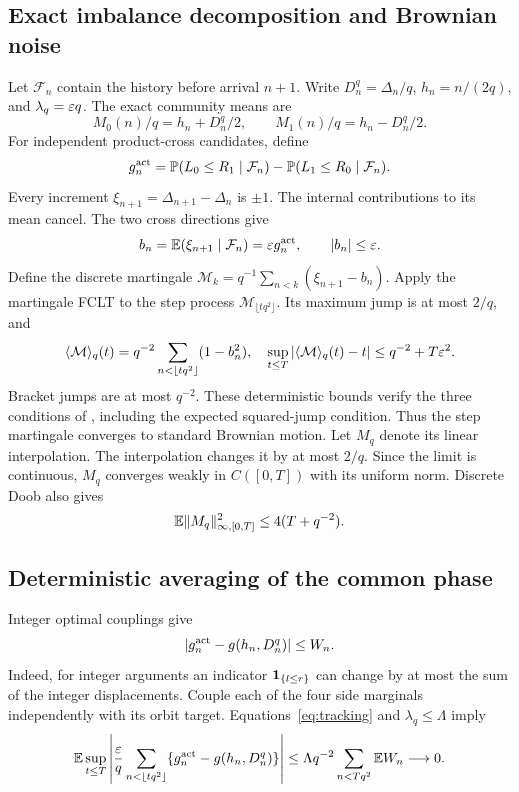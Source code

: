 \subsection{Exact imbalance decomposition and Brownian noise}
Let $\mathcal F_n$ contain the history before arrival $n+1$. Write $D_n^q=\Delta_n/q$, $h_n=n/(2q)$, and $\lambda_q=\varepsilon q$. The exact community means are
\[
 M_0(n)/q=h_n+D_n^q/2,\qquad M_1(n)/q=h_n-D_n^q/2.
\]
For independent product-cross candidates, define
\[
 g_n^{\rm act}=\mathbb P(L_0\le R_1\mid\mathcal F_n)
                -\mathbb P(L_1\le R_0\mid\mathcal F_n).
\]
Every increment $\xi_{n+1}=\Delta_{n+1}-\Delta_n$ is $\pm1$. The internal contributions to its mean cancel. The two cross directions give
\[
 b_n=\mathbb E(\xi_{n+1}\mid\mathcal F_n)=\varepsilon g_n^{\rm act},
 \qquad |b_n|\le\varepsilon.
\]
Define the discrete martingale $\mathcal M_k=q^{-1}\sum_{n<k}(\xi_{n+1}-b_n)$. Apply the martingale FCLT to the step process $\mathcal M_{\lfloor tq^2\rfloor}$. Its maximum jump is at most $2/q$, and
\[
 \langle\mathcal M\rangle_q(t)
 =q^{-2}\sum_{n<\lfloor tq^2\rfloor}(1-b_n^2),
 \quad
 \sup_{t\le T}|\langle\mathcal M\rangle_q(t)-t|
 \le q^{-2}+T\varepsilon^2.
\]
Bracket jumps are at most $q^{-2}$. These deterministic bounds verify the three conditions of \cite[Theorem~2.1(ii)]{whitt}, including the expected squared-jump condition. Thus the step martingale converges to standard Brownian motion. Let $M_q$ denote its linear interpolation. The interpolation changes it by at most $2/q$. Since the limit is continuous, $M_q$ converges weakly in $C([0,T])$ with its uniform norm. Discrete Doob also gives
\begin{equation}\label{eq:martmoment}
 \mathbb E\|M_q\|_{\infty,[0,T]}^2\le4(T+q^{-2}).
\end{equation}

\subsection{Deterministic averaging of the common phase}
Integer optimal couplings give
\[
 |g_n^{\rm act}-g(h_n,D_n^q)|\le W_n.
\]
Indeed, for integer arguments an indicator $\mathbf 1_{\{l\le r\}}$ can change by at most the sum of the integer displacements. Couple each of the four side marginals independently with its orbit target. Equations~\eqref{eq:tracking} and $\lambda_q\le\Lambda$ imply
\[
 \mathbb E\sup_{t\le T}\left|\frac{\varepsilon} q
 \sum_{n<\lfloor tq^2\rfloor}\{g_n^{\rm act}-g(h_n,D_n^q)\}\right|
 \le\Lambda q^{-2}\sum_{n<Tq^2}\mathbb E W_n\longrightarrow0.
\]

